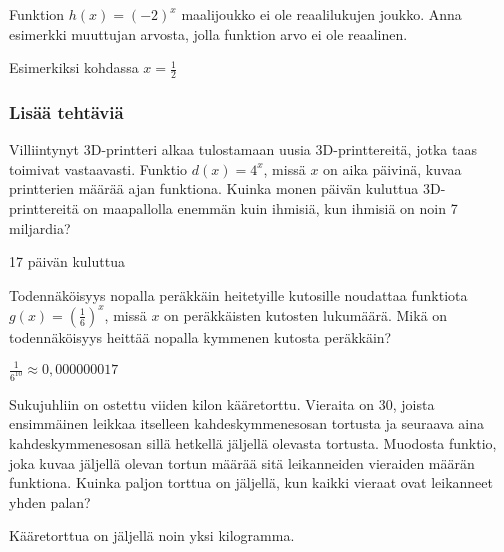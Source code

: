 \begin{tehtavasivu}
\begin{tehtava}
Funktion $ h(x)=(-2)^{x}$ maalijoukko ei ole reaalilukujen joukko. Anna esimerkki muuttujan arvosta, jolla funktion arvo ei ole reaalinen.
	\begin{vastaus}
Esimerkiksi kohdassa $x = \frac{1}{2}$
	\end{vastaus}
\end{tehtava}



\subsubsection{Lisää tehtäviä}

\begin{tehtava}
Villiintynyt 3D-printteri alkaa tulostamaan uusia 3D-printtereitä, jotka taas toimivat vastaavasti. Funktio $ d(x)=4^{x} $, missä $ x $ on aika päivinä, kuvaa printterien määrää ajan funktiona. Kuinka monen päivän kuluttua 3D-printtereitä on maapallolla enemmän kuin ihmisiä, kun ihmisiä on noin 7 miljardia?
\begin{vastaus}
17 päivän kuluttua
\end{vastaus}
\end{tehtava}

\begin{tehtava}
Todennäköisyys nopalla peräkkäin heitetyille kutosille noudattaa funktiota 
$ g(x)=(\frac{1}{6})^{x} $, missä $x$ on peräkkäisten kutosten lukumäärä.
Mikä on todennäköisyys heittää nopalla kymmenen kutosta peräkkäin?
\begin{vastaus}
$ \frac{1}{6^{10}}\approx0,000000017$
\end{vastaus}
\end{tehtava}

\begin{tehtava}
Sukujuhliin on ostettu viiden kilon kääretorttu. Vieraita on 30, joista ensimmäinen leikkaa itselleen kahdeskymmenesosan tortusta ja seuraava aina kahdeskymmenesosan sillä hetkellä jäljellä olevasta tortusta. Muodosta funktio, joka kuvaa jäljellä olevan tortun määrää sitä leikanneiden vieraiden määrän funktiona. Kuinka paljon torttua on jäljellä, kun kaikki vieraat ovat leikanneet yhden palan?
\begin{vastaus}
Kääretorttua on jäljellä noin yksi kilogramma.
\end{vastaus}
\end{tehtava}


\end{tehtavasivu}
